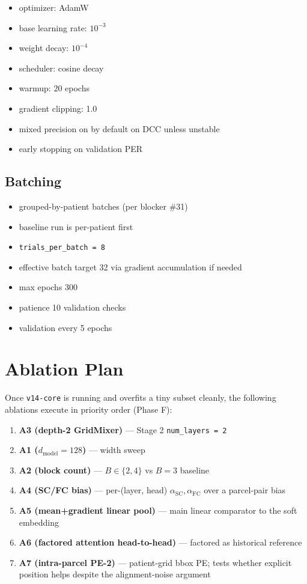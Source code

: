 \documentclass[11pt,letterpaper]{article}
\begin{document}
\begin{itemize}[leftmargin=2em, itemsep=0.2em]
\item optimizer: AdamW
\item base learning rate: $10^{-3}$
\item weight decay: $10^{-4}$
\item scheduler: cosine decay
\item warmup: 20 epochs
\item gradient clipping: 1.0
\item mixed precision on by default on DCC unless unstable
\item early stopping on validation PER
\end{itemize}

\subsection{Batching}

\begin{itemize}[leftmargin=2em, itemsep=0.2em]
\item grouped-by-patient batches (per blocker \#31)
\item baseline run is per-patient first
\item \texttt{trials\_per\_batch = 8}
\item effective batch target 32 via gradient accumulation if needed
\item max epochs 300
\item patience 10 validation checks
\item validation every 5 epochs
\end{itemize}


\section{Ablation Plan}

Once \texttt{v14-core} is running and overfits a tiny subset cleanly, the following ablations execute in priority order (Phase F):
\begin{enumerate}[leftmargin=2em, itemsep=0.2em]
\item \textbf{A3 (depth-2 GridMixer)} --- Stage 2 \texttt{num\_layers = 2}
\item \textbf{A1 ($d_{\text{model}} = 128$)} --- width sweep
\item \textbf{A2 (block count)} --- $B \in \{2, 4\}$ vs $B = 3$ baseline
\item \textbf{A4 (SC/FC bias)} --- per-(layer, head) $\alpha_{\text{SC}}, \alpha_{\text{FC}}$ over a parcel-pair bias
\item \textbf{A5 (mean+gradient linear pool)} --- main linear comparator to the soft embedding
\item \textbf{A6 (factored attention head-to-head)} --- factored as historical reference
\item \textbf{A7 (intra-parcel PE-2)} --- patient-grid bbox PE; tests whether explicit position helps despite the alignment-noise argument
\end{enumerate}
\end{document}
